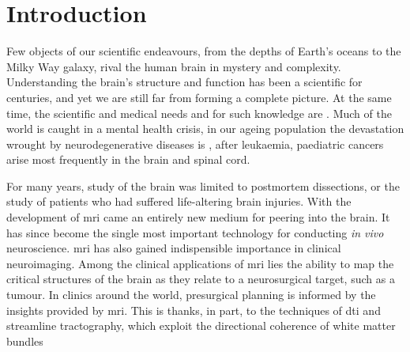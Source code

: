\chapter*{Introduction}
\label{chapterlabel0}

Few objects of our scientific endeavours, from the depths of Earth's oceans to the Milky Way galaxy, rival the human brain in mystery and complexity.
Understanding the brain's structure and function has been a scientific  for centuries, and yet we are still far from forming a complete picture.
At the same time, the scientific and medical needs and for such knowledge are .
Much of the world is caught in a mental health crisis, in our ageing population the devastation wrought by neurodegenerative diseases is , after leukaemia, paediatric cancers arise most frequently in the brain and spinal cord.

For many years, study of the brain was limited to postmortem dissections, or the study of patients who had suffered life-altering brain injuries.
With the development of \gls{mri} came an entirely new medium for peering into the brain.
It has since become the single most important  technology for conducting \textit{in vivo} neuroscience.
\Gls{mri} has also gained indispensible importance in clinical neuroimaging.
Among the clinical applications of \gls{mri} lies the ability to map the critical structures of the brain as they relate to a neurosurgical target, such as a tumour.
In clinics around the  world, presurgical planning is informed by the insights provided by  \gls{mri}.
This is thanks, in part, to the techniques of \gls{dti} and streamline tractography, which exploit the directional coherence of white matter bundles 

